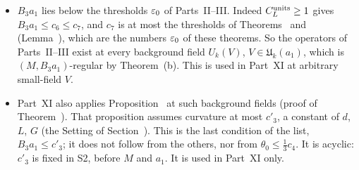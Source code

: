 \begin{detail}
\begin{step}
\begin{itemize}
\item $B_3a_1$ lies below the thresholds $\varepsilon_0$ of Parts~II--III. Indeed $C^{\rm units}_L\ge1$ gives $B_3a_1\le c_6\le c_7$, and $c_7$ is at most the thresholds of Theorems~ and~ (Lemma~), which are the numbers $\varepsilon_0$ of these theorems. So the operators of Parts~II--III exist at every background field $U_k(V)$, $V\in\mathfrak U_k(a_1)$, which is $(M,B_3a_1)$-regular by Theorem~(b). This is used in Part~XI at arbitrary small-field $V$.
\item Part~XI also applies Proposition~ at such background fields (proof of Theorem~). That proposition assumes curvature at most $c'_3$, a constant of $d$, $L$, $G$ (the Setting of Section~). This is the last condition of the list, $B_3a_1\le c'_3$; it does not follow from the others, nor from $\theta_0\le\frac13c_4$. It is acyclic: $c'_3$ is fixed in S2, before $M$ and $a_1$. It is used in Part~XI only.
\end{itemize}
\end{step}
\end{detail}

